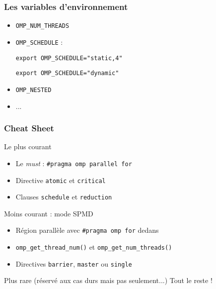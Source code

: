\documentclass{beamer}
\begin{document}
\begin{frame}
  \frametitle{Les variables d'environnement}
  \begin{itemize}
  \item {\tt OMP\_NUM\_THREADS}
  \item {\tt OMP\_SCHEDULE} :

{\tt export OMP\_SCHEDULE="static,4"}

{\tt export OMP\_SCHEDULE="dynamic"}

    
      
      

  \item {\tt OMP\_NESTED} 

  \item ...
    
  \end{itemize}

  
\end{frame}


\begin{frame}[fragile]
  \frametitle{Cheat Sheet}

  \begin{exampleblock}{Le plus courant}
    \begin{itemize}
    \item Le \textit{must} : \verb|#pragma omp parallel for|
    \item Directive \verb|atomic| et \verb|critical|
    \item Clauses \verb|schedule| et \verb|reduction|
    \end{itemize}
  \end{exampleblock}

  \begin{block}{Moins courant : mode SPMD}
    \begin{itemize}
    \item Région parallèle avec \verb|#pragma omp for| dedans
    \item \verb|omp_get_thread_num()| et \verb|omp_get_num_threads()|
    \item Directives \verb|barrier|, \verb|master| ou \verb|single|
    \end{itemize}
  \end{block}

  \begin{alertblock}{Plus rare (réservé aux cas durs mais pas seulement...)}
    Tout le reste !
  \end{alertblock}
\end{frame}
\end{document}
